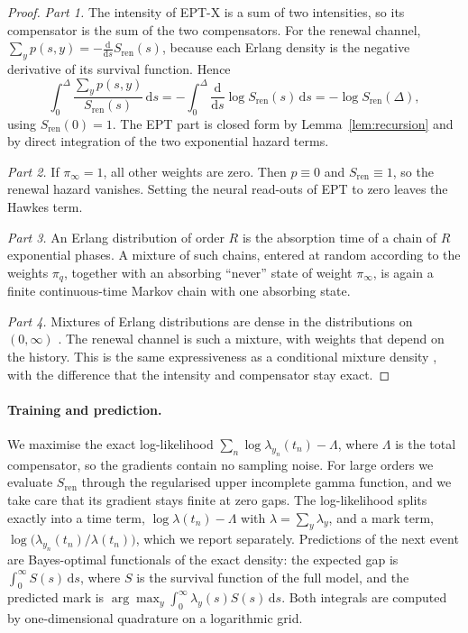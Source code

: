 \begin{proof}
\emph{Part 1.} The intensity of EPT-X is a sum of two intensities, so its compensator is the sum of
the two compensators. For the renewal channel, $\sum_y p(s,y)=-\frac{\mathrm{d}}{\mathrm{d}s}S_{\mathrm{ren}}(s)$,
because each Erlang density is the negative derivative of its survival function. Hence
\[
\int_0^{\Delta}\frac{\sum_y p(s,y)}{S_{\mathrm{ren}}(s)}\,\mathrm{d}s
=-\int_0^{\Delta}\frac{\mathrm{d}}{\mathrm{d}s}\log S_{\mathrm{ren}}(s)\,\mathrm{d}s
=-\log S_{\mathrm{ren}}(\Delta),
\]
using $S_{\mathrm{ren}}(0)=1$. The EPT part is closed form by Lemma~\ref{lem:recursion} and by direct
integration of the two exponential hazard terms.

\emph{Part 2.} If $\pi_\infty=1$, all other weights are zero. Then $p\equiv0$ and $S_{\mathrm{ren}}\equiv1$,
so the renewal hazard vanishes. Setting the neural read-outs of EPT to zero leaves the Hawkes term.

\emph{Part 3.} An Erlang distribution of order $R$ is the absorption time of a chain of $R$
exponential phases. A mixture of such chains, entered at random according to the weights
$\pi_q$, together with an absorbing ``never'' state of weight $\pi_\infty$, is again a finite
continuous-time Markov chain with one absorbing state.

\emph{Part 4.} Mixtures of Erlang distributions are dense in the distributions on $(0,\infty)$
\citep{tijms1994stochastic,lee2010modeling}. The renewal channel is such a mixture, with weights
that depend on the history. This is the same expressiveness as a conditional mixture density
\citep{shchur2020intensity}, with the difference that the intensity and compensator stay exact.
\end{proof}

\paragraph{Training and prediction.} We maximise the exact log-likelihood
$\sum_n\log\lambda_{y_n}(t_n)-\Lambda$, where $\Lambda$ is the total compensator, so the gradients
contain no sampling noise. For large orders we evaluate $S_{\mathrm{ren}}$ through the regularised
upper incomplete gamma function, and we take care that its gradient stays finite at zero gaps. The
log-likelihood splits exactly into a time term, $\log\lambda(t_n)-\Lambda$ with
$\lambda=\sum_y\lambda_y$, and a mark term, $\log\bigl(\lambda_{y_n}(t_n)/\lambda(t_n)\bigr)$, which we
report separately. Predictions of the next event are Bayes-optimal functionals of the exact
density: the expected gap is $\int_0^\infty S(s)\,\mathrm{d}s$, where $S$ is the survival function
of the full model, and the predicted mark is $\arg\max_y\int_0^\infty\lambda_y(s)S(s)\,\mathrm{d}s$.
Both integrals are computed by one-dimensional quadrature on a logarithmic grid.

